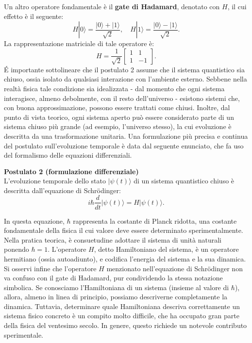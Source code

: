 \documentclass[a4paper,12pt]{report}
\theoremstyle{plain}
\begin{document}
Un altro operatore fondamentale è il \textbf{gate di Hadamard}, denotato con \(H\), il cui effetto è il seguente:
\[
H|0\rangle = \frac{|0\rangle + |1\rangle}{\sqrt{2}}, \quad H|1\rangle = \frac{|0\rangle - |1\rangle}{\sqrt{2}}.
\]
La rappresentazione matriciale di tale operatore è:
\[
H = \frac{1}{\sqrt{2}}\begin{bmatrix}1 & 1\\ 1 & -1\end{bmatrix}.
\]
É importante sottolineare che il postulato 2 assume che il sistema quantistico sia chiuso, ossia isolato da qualsiasi interazione con l'ambiente esterno. Sebbene nella realtà fisica tale condizione sia idealizzata - dal momento che ogni sistema interagisce, almeno debolmente, con il resto dell'universo - esistono sistemi che, con buona approssimazione, possono essere trattati come chiusi. Inoltre, dal punto di vista teorico, ogni sistema aperto può essere considerato parte di un sistema chiuso più grande (ad esempio, l'universo stesso), la cui evoluzione è descritta da una trasformazione unitaria.
Una formulazione più precisa e continua del postulato sull'evoluzione temporale è data dal seguente enunciato, che fa uso del formalismo delle equazioni differenziali.
\begin{framed}
\textbf{Postulato 2 (formulazione differenziale)} \\
L'evoluzione temporale dello stato \( |\psi(t) \rangle \) di un sistema quantistico chiuso è descritta dall'equazione di Schrödinger:
\[
i\hbar\frac{d}{dt}|\psi(t)\rangle = H |\psi(t)\rangle.
\]
\end{framed}
In questa equazione, \(\hbar\) rappresenta la costante di Planck ridotta, una costante fondamentale della fisica il cui valore deve essere determinato sperimentalmente. Nella pratica teorica, è consuetudine adottare il sistema di unità naturali ponendo \(\hbar = 1\). L'operatore \(H\), detto Hamiltoniano del sistema, è un operatore hermitiano (ossia autoadiunto), e codifica l'energia del sistema e la sua dinamica.
Si osservi infine che l'operatore \(H\) menzionato nell'equazione di Schrödinger non va confuso con il gate di Hadamard, pur condividendo la stessa notazione simbolica.
Se conosciamo l'Hamiltoniana di un sistema (insieme al valore di \(\hbar\)), allora, almeno in linea di principio, possiamo descriverne completamente la dinamica. Tuttavia, determinare quale Hamiltoniana descriva correttamente un sistema fisico concreto è un compito molto difficile, che ha occupato gran parte della fisica del ventesimo secolo. In genere, questo richiede un notevole contributo sperimentale.
\end{document}
